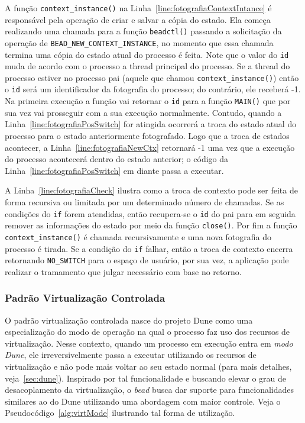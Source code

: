 A função \texttt{context\_instance()} na
Linha~\ref{line:fotografiaContextIntance} é responsável pela operação de criar
e salvar a cópia do estado. Ela começa realizando uma chamada para a função
\texttt{beadctl()} passando a solicitação da operação de
\texttt{BEAD\_NEW\_CONTEXT\_INSTANCE}, no momento que essa chamada termina uma
cópia do estado atual do processo é feita. Note que o valor do \texttt{id} muda
de acordo com o processo a thread principal do processo. Se a thread do processo estiver no
processo pai (aquele que chamou \texttt{context\_instance()}) então o
\texttt{id} será um identificador da fotografia do processo; do contrário, ele
receberá -1. Na primeira execução a função vai retornar o \texttt{id} para a
função \texttt{MAIN()} que por sua vez vai prosseguir com a sua execução
normalmente. Contudo, quando a Linha~\ref{line:fotografiaPosSwitch} for
atingida ocorrerá a troca do estado atual do processo para o estado
anteriormente fotografado. Logo que a troca de estados acontecer, a
Linha~\ref{line:fotografiaNewCtx} retornará -1 uma vez que a execução do
processo acontecerá dentro do estado anterior; o código da
Linha~\ref{line:fotografiaPosSwitch} em diante passa a executar.

A Linha~\ref{line:fotografiaCheck} ilustra como a troca de contexto pode ser
feita de forma recursiva ou limitada por um determinado número de chamadas. Se
as condições do \texttt{if} forem atendidas, então recupera-se o \texttt{id} do
pai para em seguida remover as informações do estado por meio da função
\texttt{close()}. Por fim a função \texttt{context\_instance()} é chamada
recursivamente e uma nova fotografia do processo é tirada. Se a condição do
\texttt{if} falhar, então a troca de contexto encerra retornando
\texttt{NO\_SWITCH} para o espaço de usuário, por sua vez, a aplicação pode
realizar o tramamento que julgar necessário com base no retorno.

\subsubsection{Padrão Virtualização Controlada}

O padrão virtualização controlada nasce do projeto Dune como uma especialização
do modo de operação na qual o processo faz uso dos recursos de virtualização.
Nesse contexto, quando um processo em execução entra em \emph{modo Dune}, ele
irreversivelmente passa a executar utilizando os recursos de virtualização e
não pode mais voltar ao seu estado normal (para mais detalhes,
veja~\ref{sec:dune}). Inspirado por tal funcionalidade e buscando elevar o grau
de desacoplamento da virtualização, o \emph{bead} busca dar suporte para
funcionalidades similares ao do Dune utilizando uma abordagem com maior
controle. Veja o Pseudocódigo~\ref{alg:virtMode} ilustrando tal forma de
utilização.

